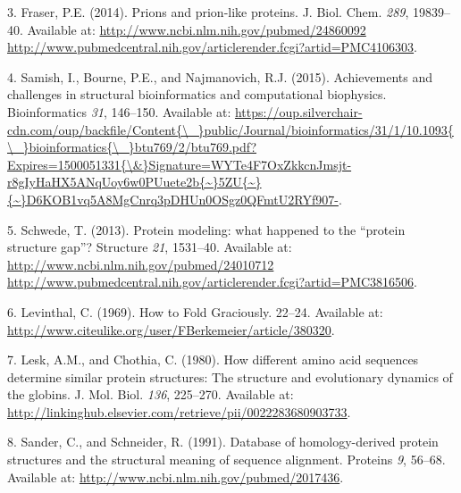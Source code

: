 \documentclass[11pt,a4paper,twoside]{book}
\theoremstyle{definition}
\theoremstyle{definition}
\theoremstyle{remark}
\begin{document}
\hypertarget{ref-Fraser2014}{}
3. Fraser, P.E. (2014). Prions and prion-like proteins. J. Biol. Chem.
\emph{289}, 19839--40. Available at:
\href{http://www.ncbi.nlm.nih.gov/pubmed/24860092\%20http://www.pubmedcentral.nih.gov/articlerender.fcgi?artid=PMC4106303}{http://www.ncbi.nlm.nih.gov/pubmed/24860092 http://www.pubmedcentral.nih.gov/articlerender.fcgi?artid=PMC4106303}.

\hypertarget{ref-Samish2015}{}
4. Samish, I., Bourne, P.E., and Najmanovich, R.J. (2015). Achievements
and challenges in structural bioinformatics and computational
biophysics. Bioinformatics \emph{31}, 146--150. Available at:
\href{https://oup.silverchair-cdn.com/oup/backfile/Content\%7B/_\%7Dpublic/Journal/bioinformatics/31/1/10.1093\%7B/_\%7Dbioinformatics\%7B/_\%7Dbtu769/2/btu769.pdf?Expires=1500051331\%7B/\&\%7DSignature=WYTe4F7OxZkkcnJmsjt-r8gIyHaHX5ANqUoy6w0PUuete2b\%7B~\%7D5ZU\%7B~\%7D\%7B~\%7DD6KOB1vq5A8MgCnrq3pDHUn0OSgz0QFmtU2RYf907-}{https://oup.silverchair-cdn.com/oup/backfile/Content\{\textbackslash{}\_\}public/Journal/bioinformatics/31/1/10.1093\{\textbackslash{}\_\}bioinformatics\{\textbackslash{}\_\}btu769/2/btu769.pdf?Expires=1500051331\{\textbackslash{}\&\}Signature=WYTe4F7OxZkkcnJmsjt-r8gIyHaHX5ANqUoy6w0PUuete2b\{\textasciitilde{}\}5ZU\{\textasciitilde{}\}\{\textasciitilde{}\}D6KOB1vq5A8MgCnrq3pDHUn0OSgz0QFmtU2RYf907-}.

\hypertarget{ref-Schwede2013}{}
5. Schwede, T. (2013). Protein modeling: what happened to the ``protein
structure gap''? Structure \emph{21}, 1531--40. Available at:
\href{http://www.ncbi.nlm.nih.gov/pubmed/24010712\%20http://www.pubmedcentral.nih.gov/articlerender.fcgi?artid=PMC3816506}{http://www.ncbi.nlm.nih.gov/pubmed/24010712 http://www.pubmedcentral.nih.gov/articlerender.fcgi?artid=PMC3816506}.

\hypertarget{ref-Levinthal1969}{}
6. Levinthal, C. (1969). How to Fold Graciously. 22--24. Available at:
\url{http://www.citeulike.org/user/FBerkemeier/article/380320}.

\hypertarget{ref-Lesk1980}{}
7. Lesk, A.M., and Chothia, C. (1980). How different amino acid
sequences determine similar protein structures: The structure and
evolutionary dynamics of the globins. J. Mol. Biol. \emph{136},
225--270. Available at:
\url{http://linkinghub.elsevier.com/retrieve/pii/0022283680903733}.

\hypertarget{ref-Sander1991}{}
8. Sander, C., and Schneider, R. (1991). Database of homology-derived
protein structures and the structural meaning of sequence alignment.
Proteins \emph{9}, 56--68. Available at:
\url{http://www.ncbi.nlm.nih.gov/pubmed/2017436}.
\end{document}

